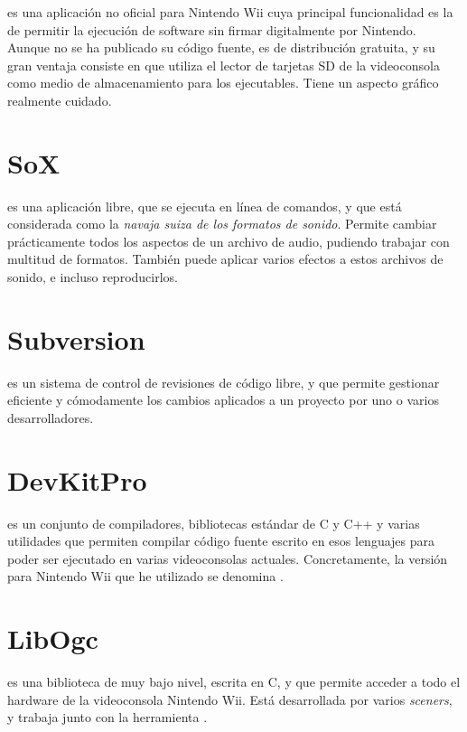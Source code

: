  \cite{website:hbc} es una aplicación no oficial para Nintendo Wii cuya principal funcionalidad es la de permitir la ejecución de software sin firmar digitalmente por Nintendo. Aunque no se ha publicado su código fuente, es de distribución gratuita, y su gran ventaja consiste en que utiliza el lector de tarjetas SD de la videoconsola como medio de almacenamiento para los ejecutables. Tiene un aspecto gráfico realmente cuidado.

\section*{SoX}

 \cite{website:sox} es una aplicación libre, que se ejecuta en línea de comandos, y que está considerada como la \emph{navaja suiza de los formatos de sonido}. Permite cambiar prácticamente todos los aspectos de un archivo de audio, pudiendo trabajar con multitud de formatos. También puede aplicar varios efectos a estos archivos de sonido, e incluso reproducirlos.

\section*{Subversion}

 es un sistema de control de revisiones de código libre, y que permite gestionar eficiente y cómodamente los cambios aplicados a un proyecto por uno o varios desarrolladores.

\section*{DevKitPro}

 \cite{website:devkitpro} es un conjunto de compiladores, bibliotecas estándar de C y C++ y varias utilidades que permiten compilar código fuente escrito en esos lenguajes para poder ser ejecutado en varias videoconsolas actuales. Concretamente, la versión para Nintendo Wii que he utilizado se denomina .

\section*{LibOgc}

 \cite{website:libogc} es una biblioteca de muy bajo nivel, escrita en C, y que permite acceder a todo el hardware de la videoconsola Nintendo Wii. Está desarrollada por varios \emph{sceners}, y trabaja junto con la herramienta .

